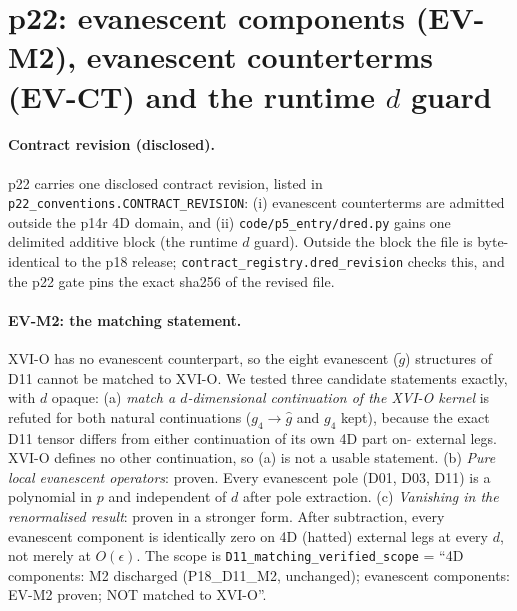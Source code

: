 \section{p22: evanescent components (EV-M2), evanescent counterterms (EV-CT) and the runtime $d$ guard}
\label{sec:p22-evanescent}

\paragraph{Contract revision (disclosed).} p22 carries one disclosed contract revision, listed in
\texttt{p22\_conventions.CONTRACT\_REVISION}: (i) evanescent counterterms are admitted outside the p14r 4D domain, and
(ii) \texttt{code/p5\_entry/dred.py} gains one delimited additive block (the runtime $d$ guard). Outside the block the
file is byte-identical to the p18 release; \texttt{contract\_registry.dred\_revision} checks this, and the p22 gate pins
the exact sha256 of the revised file.

\paragraph{EV-M2: the matching statement.} XVI-O has no evanescent counterpart, so the eight evanescent ($\tilde g$)
structures of D11 cannot be matched to XVI-O. We tested three candidate statements exactly, with $d$ opaque:
(a) \emph{match a $d$-dimensional continuation of the XVI-O kernel} is refuted for both natural continuations
($g_4\to\hat g$ and $g_4$ kept), because the exact D11 tensor differs from either continuation of its own 4D part on
$\tilde{}$ external legs. XVI-O defines no other continuation, so (a) is not a usable statement.
(b) \emph{Pure local evanescent operators}: proven. Every evanescent pole (D01, D03, D11) is a polynomial in $p$ and
independent of $d$ after pole extraction.
(c) \emph{Vanishing in the renormalised result}: proven in a stronger form. After subtraction, every evanescent
component is identically zero on 4D (hatted) external legs at every $d$, not merely at $O(\epsilon)$.
The scope is \texttt{D11\_matching\_verified\_scope} = ``4D components: M2 discharged (P18\_D11\_M2, unchanged);
evanescent components: EV-M2 proven; NOT matched to XVI-O''.

